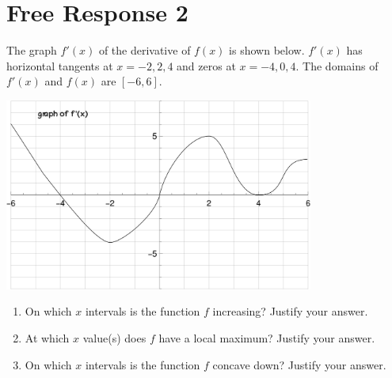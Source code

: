 \documentclass{article}
\begin{document}
\clearpage
\section{Free Response 2}

The graph $f'(x)$  of the derivative of $f(x)$ is shown below. $f'(x)$ has horizontal tangents at $x=-2,2,4$ and zeros at $x=-4,0,4$.
The domains of $f'(x)$ and $f(x)$ are $[-6,6]$.

\begin{center}
	\includegraphics[width=4in]{media/g.png}
\end{center}

\begin{enumerate}
	\setlength{\itemsep}{1in}
	\item On which $x$ intervals is the function $f$ increasing? Justify your answer.
	\item At which $x$ value(s) does $f$ have a local maximum? Justify your answer.
	\item On which $x$ intervals is the function $f$ concave down? Justify your answer.
\end{enumerate}
\end{document}
